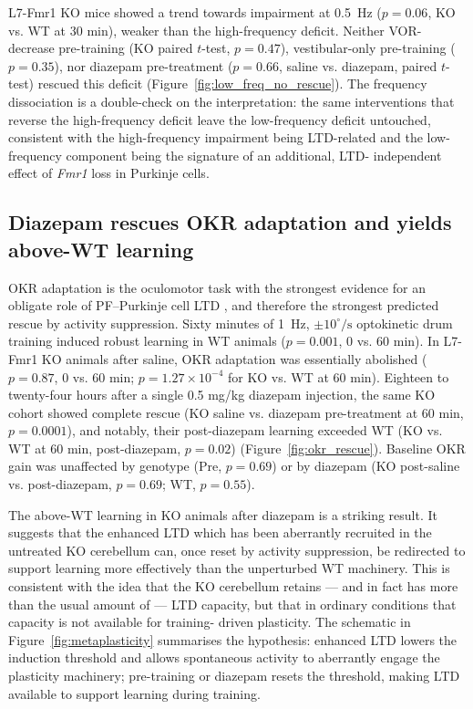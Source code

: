 \documentclass[11pt]{article}
\begin{document}
L7-Fmr1 KO mice showed a trend towards impairment at 0.5~Hz ($p = 0.06$,
KO vs. WT at 30 min), weaker than the high-frequency deficit. Neither
VOR-decrease pre-training (KO paired $t$-test, $p = 0.47$),
vestibular-only pre-training ($p = 0.35$), nor diazepam pre-treatment
($p = 0.66$, saline vs. diazepam, paired $t$-test) rescued this deficit
(Figure~\ref{fig:low_freq_no_rescue}). The frequency dissociation is a
double-check on the interpretation: the same interventions that reverse
the high-frequency deficit leave the low-frequency deficit untouched,
consistent with the high-frequency impairment being LTD-related and the
low-frequency component being the signature of an additional, LTD-
independent effect of \textit{Fmr1} loss in Purkinje cells.

\subsection{Diazepam rescues OKR adaptation and yields above-WT learning}

OKR adaptation is the oculomotor task with the strongest evidence for an
obligate role of PF--Purkinje cell LTD \citep{inoshita2018okr,
takeuchi2008delphilin}, and therefore the strongest predicted rescue by
activity suppression. Sixty minutes of 1~Hz, $\pm 10^{\circ}/\text{s}$
optokinetic drum training induced robust learning in WT animals
($p = 0.001$, 0 vs. 60 min). In L7-Fmr1 KO animals after saline, OKR
adaptation was essentially abolished ($p = 0.87$, 0 vs. 60 min;
$p = 1.27 \times 10^{-4}$ for KO vs. WT at 60 min). Eighteen to twenty-four
hours after a single 0.5 mg/kg diazepam injection, the same KO cohort
showed complete rescue (KO saline vs. diazepam pre-treatment at 60 min,
$p = 0.0001$), and notably, their post-diazepam learning exceeded WT
(KO vs. WT at 60 min, post-diazepam, $p = 0.02$)
(Figure~\ref{fig:okr_rescue}). Baseline OKR gain was unaffected by
genotype (Pre, $p = 0.69$) or by diazepam (KO post-saline vs.
post-diazepam, $p = 0.69$; WT, $p = 0.55$).

The above-WT learning in KO animals after diazepam is a striking result.
It suggests that the enhanced LTD which has been aberrantly recruited in
the untreated KO cerebellum can, once reset by activity suppression, be
redirected to support learning more effectively than the unperturbed WT
machinery. This is consistent with the idea that the KO cerebellum retains
--- and in fact has more than the usual amount of --- LTD capacity, but
that in ordinary conditions that capacity is not available for training-
driven plasticity. The schematic in
Figure~\ref{fig:metaplasticity} summarises the hypothesis: enhanced
LTD lowers the induction threshold and allows spontaneous activity to
aberrantly engage the plasticity machinery; pre-training or diazepam
resets the threshold, making LTD available to support learning during
training.
\end{document}
